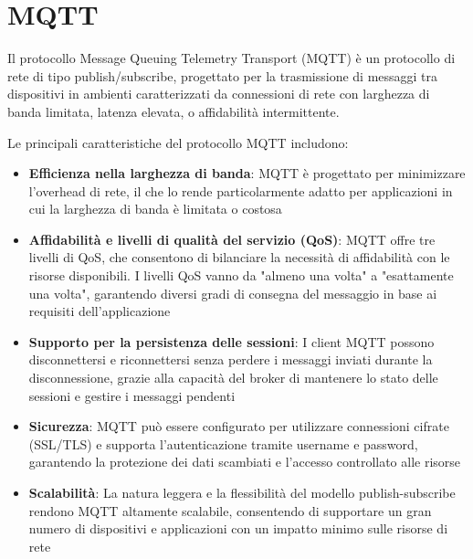 \section{MQTT} \label{mqtt}

Il protocollo Message Queuing Telemetry Transport (MQTT) è un protocollo di rete di tipo publish/subscribe, progettato per la trasmissione di messaggi tra dispositivi in ambienti caratterizzati da connessioni di rete con larghezza di banda limitata, latenza elevata, o affidabilità intermittente.

\noindent Le principali caratteristiche del protocollo MQTT includono:

\begin{itemize}
  \item \textbf{Efficienza nella larghezza di banda}: MQTT è progettato per minimizzare l'overhead di rete, il che lo rende particolarmente adatto per applicazioni in cui la larghezza di banda è limitata o costosa
    
  \item \textbf{Affidabilità e livelli di qualità del servizio (QoS)}: MQTT offre tre livelli di QoS, che consentono di bilanciare la necessità di affidabilità con le risorse disponibili. I livelli QoS vanno da "almeno una volta" a "esattamente una volta", garantendo diversi gradi di consegna del messaggio in base ai requisiti dell'applicazione
    
  \item \textbf{Supporto per la persistenza delle sessioni}: I client MQTT possono disconnettersi e riconnettersi senza perdere i messaggi inviati durante la disconnessione, grazie alla capacità del broker di mantenere lo stato delle sessioni e gestire i messaggi pendenti

  \item \textbf{Sicurezza}: MQTT può essere configurato per utilizzare connessioni cifrate (SSL/TLS) e supporta l'autenticazione tramite username e password, garantendo la protezione dei dati scambiati e l'accesso controllato alle risorse

  \item \textbf{Scalabilità}: La natura leggera e la flessibilità del modello publish-subscribe rendono MQTT altamente scalabile, consentendo di supportare un gran numero di dispositivi e applicazioni con un impatto minimo sulle risorse di rete
\end{itemize}

